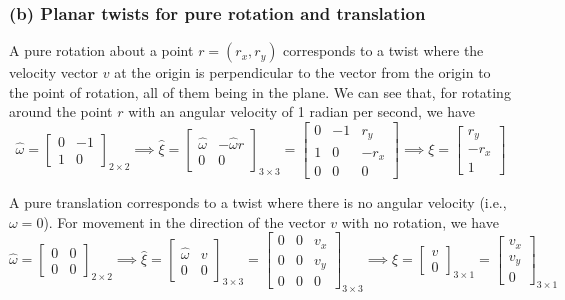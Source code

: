 \subsubsection*{(b) Planar twists for pure rotation and translation}

A pure rotation about a point \( r = (r_x, r_y) \) corresponds to a twist where the velocity vector \( v \) at the origin is perpendicular to the vector from the origin to the point of rotation, all of them being in the plane.
We can see that, for rotating around the point \( r \) with an angular velocity of 1 radian per second, we have
\[
    \widehat \omega
    =
    \begin{bmatrix}
        0 & -1 \\
        1 & 0
    \end{bmatrix}_{2\times 2}
    \implies
    \hat{\xi}
    =
    \begin{bmatrix}
        \widehat{\omega} & -\widehat{\omega} r \\
        0                & 0
    \end{bmatrix}_{3\times 3}
    =
    \begin{bmatrix}
        0 & -1 & r_y  \\
        1 & 0  & -r_x \\
        0 & 0  & 0
    \end{bmatrix}
    \implies
    \boxed{
        \xi
        =
        \begin{bmatrix}
            r_y  \\
            -r_x \\
            1
        \end{bmatrix}
    }
\]

A pure translation corresponds to a twist where there is no angular velocity (i.e., \( \omega = 0 \)).
For movement in the direction of the vector \( v \) with no rotation, we have
\[
    \widehat \omega
    =
    \begin{bmatrix}
        0 & 0 \\
        0 & 0
    \end{bmatrix}_{2\times 2}
    \implies
    \hat{\xi}
    =
    \begin{bmatrix}
        \widehat{\omega} & v \\
        0                & 0
    \end{bmatrix}_{3\times 3}
    =
    \begin{bmatrix}
        0 & 0 & v_x \\
        0 & 0 & v_y \\
        0 & 0 & 0
    \end{bmatrix}_{3\times 3}
    \implies
    \boxed{
    \xi
    =
    \begin{bmatrix}
        v \\
        0
    \end{bmatrix}_{3\times 1}
    =
    \begin{bmatrix}
        v_x \\
        v_y \\
        0
    \end{bmatrix}_{3\times 1}
    }
\]

